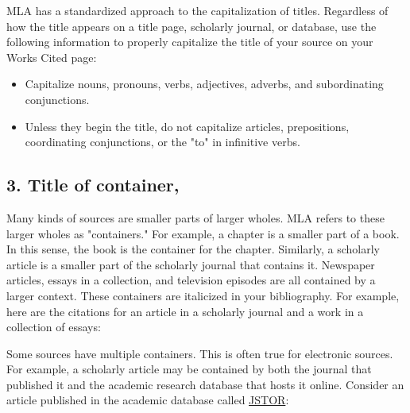 \begin{center}
\begin{tcolorbox}[colframe=oyster, coltitle=black, sharp corners, title=\ding{52} Capitalization of titles in MLA]

MLA has a standardized approach to the capitalization of titles. Regardless of how the title appears on a title page, scholarly journal, or database, use the following information to properly capitalize the title of your source on your Works Cited page:

\medskip
\begin{itemize}
\item Capitalize nouns, pronouns, verbs, adjectives, adverbs, and subordinating conjunctions.

\item Unless they begin the title, do not capitalize articles, prepositions, coordinating conjunctions, or the "to" in infinitive verbs.
\end{itemize}

\end{tcolorbox}
\end{center}


\subsection{3. Title of container,}

Many kinds of sources are smaller parts of larger wholes. MLA refers to these larger wholes as "containers." For example, a chapter is a smaller part of a book. In this sense, the book is the container for the chapter. Similarly, a scholarly article is a smaller part of the scholarly journal that contains it. Newspaper articles, essays in a collection, and television episodes are all contained by a larger context. These containers are italicized in your bibliography. For example, here are the citations for an article in a scholarly journal and a work in a collection of essays:

\bigskip

 \bigskip


 \bigskip

\noindent Some sources have multiple containers. This is often true for electronic sources. For example, a scholarly article may be contained by both the journal that published it and the academic research database that hosts it online. Consider an article published in the academic database called \href{https://www.jstor.org/}{JSTOR}: \bigskip

